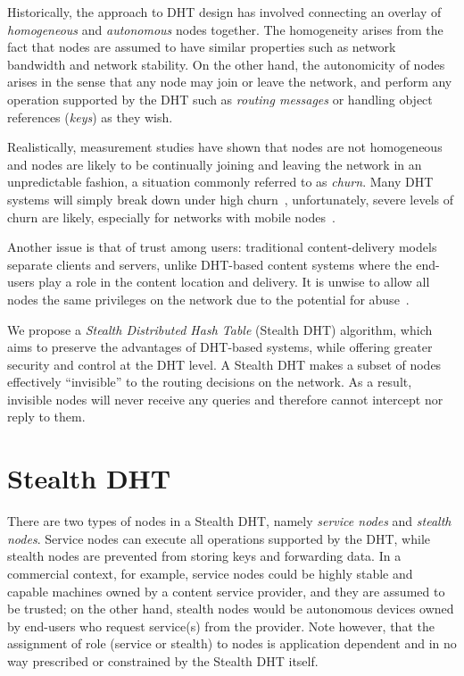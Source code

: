 \documentclass{sig-alt-release2}
\begin{document}
Historically, the approach to DHT design has involved connecting an
overlay of {\em homogeneous} and {\em autonomous} nodes together.
The homogeneity arises from the fact that nodes are assumed to have
similar properties such as network bandwidth and network stability.
On the other hand, the autonomicity of nodes arises in the sense
that any node may join or leave the network, and perform any
operation supported by the DHT such as {\em routing messages} or
handling object references ({\em keys}) as they wish.

Realistically, measurement studies have shown that nodes are not
homogeneous~\cite{sgg02} and nodes are likely to be continually
joining and leaving the network in an unpredictable fashion, a
situation commonly referred to as {\em churn}. Many DHT systems will
simply break down under high churn~\cite{churn1}, unfortunately,
severe levels of churn are likely, especially for networks with
mobile nodes~\cite{mobilechurn}\cite{dhtmanet01}.

Another issue is that of trust among users: traditional
content-delivery models separate clients and servers, unlike
DHT-based content systems where the end-users play a role in the
content location and delivery. It is unwise to allow all nodes the
same privileges on the network due to the potential for
abuse~\cite{dhtsec}\cite{DDoS_p2p05}.

We propose  a {\em Stealth Distributed Hash Table} (Stealth DHT)
algorithm, which aims to preserve the advantages of DHT-based
systems, while offering greater security and control at the DHT
level. A Stealth DHT makes a subset of nodes effectively
``invisible'' to the routing decisions on the network. As a result,
invisible nodes will never receive any queries and therefore cannot
intercept nor reply to them.

\section{Stealth DHT}
\label{sect:stealth}

There are two types of nodes in a Stealth DHT, namely {\em service
nodes} and {\em stealth nodes}. Service nodes can execute all
operations supported by the DHT, while stealth nodes are prevented
from storing keys and forwarding data. In a commercial context, for
example, service nodes could be highly stable and capable machines
owned by a content service provider, and they are assumed to be
trusted; on the other hand, stealth nodes would be autonomous
devices owned by end-users who request service(s) from the provider.
Note however, that the assignment of role (service or stealth) to
nodes is application dependent and in no way prescribed or
constrained by the Stealth DHT itself.
\end{document}
